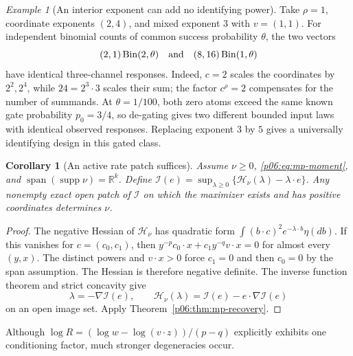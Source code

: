 \documentclass[11pt,letterpaper]{article}
\newtheorem{corollary}[theorem]{Corollary}
\theoremstyle{definition}
\theoremstyle{remark}
\newtheorem{example}[theorem]{Example}
\newcommand{\1}{\mathbf 1}
\begin{document}
\begin{example}[An interior exponent can add no identifying power]
Take $\rho=1$, coordinate exponents $(2,4)$, and mixed exponent $3$
with $v=(1,1)$. For independent binomial counts of common success
probability $\theta$, the two vectors
\[
 (2,1)\operatorname{Bin}(2,\theta)
 \quad\hbox{and}\quad
 (8,16)\operatorname{Bin}(1,\theta)
\]
have identical three-channel responses. Indeed, $c=2$ scales the
coordinates by $2^2,2^4$, while $24=2^3\cdot3$ scales their sum;
the factor $c^\rho=2$ compensates for the number of summands.
At $\theta=1/100$, both zero atoms exceed the same known gate
probability $p_0=3/4$, so de-gating gives two different bounded input
laws with identical observed responses. Replacing exponent $3$ by $5$
gives a universally identifying design in this gated class.
\end{example}

\begin{corollary}[An active rate patch suffices]
\label{p06:cor:mp-rate-patch}
Assume $\nu\ge0$, \eqref{p06:eq:mp-moment}, and
$\operatorname{span}(\operatorname{supp}\nu)=\mathbb R^k$.
Define
$\mathcal I(e)=\sup_{\lambda\ge0}
 \{\mathcal H_\nu(\lambda)-\lambda\cdot e\}$.
Any nonempty exact open patch of $\mathcal I$ on which the
maximizer exists and has positive coordinates determines $\nu$.
\end{corollary}
\begin{proof}
The negative Hessian of $\mathcal H_\nu$ has quadratic form
$\int(b\cdot c)^2e^{-\lambda\cdot b}\eta(db)$.
If this vanishes for $c=(c_0,c_1)$, then
$y^{-p}c_0\cdot x+c_1y^{-q}v\cdot x=0$ for almost every $(y,x)$.
The distinct powers and $v\cdot x>0$ force $c_1=0$ and then
$c_0=0$ by the span assumption. The Hessian is therefore negative
definite. The inverse function theorem and strict concavity give
\[
 \lambda=-\nabla\mathcal I(e),\qquad
 \mathcal H_\nu(\lambda)
       =\mathcal I(e)-e\cdot\nabla\mathcal I(e)
\]
on an open image set. Apply Theorem~\ref{p06:thm:mp-recovery}.
\end{proof}

Although $\log R=(\log w-\log(v\cdot z))/(p-q)$ explicitly
exhibits one conditioning factor, much stronger degeneracies occur.
\end{document}
